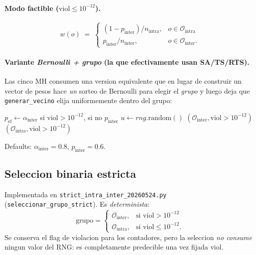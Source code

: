 \documentclass[11pt,a4paper]{article}
\newcommand{\mh}{MH}
\newcommand{\code}[1]{\texttt{#1}}
\begin{document}
\paragraph{Modo factible ($\text{viol}\le 10^{-12}$).}
\begin{equation}
w(o) \;=\;
\begin{cases}
(1-p_{\text{inter}})/n_{\text{intra}}, & o\in\mathcal{O}_{\text{intra}}\\
p_{\text{inter}}/n_{\text{inter}}, & o\in\mathcal{O}_{\text{inter}}.
\end{cases}
\end{equation}

\paragraph{Variante \emph{Bernoulli + grupo} (la que efectivamente usan SA/TS/RTS).}
Las cinco \mh{} consumen una version equivalente que en lugar de
construir un vector de pesos hace \emph{un} sorteo de Bernoulli para
elegir el \emph{grupo} y luego deja que \code{generar\_vecino} elija
uniformemente dentro del grupo:
\begin{algorithm}[H]
\caption{\textsc{SeleccionarGrupo}$(rng,\text{viol},\mathcal{O}_{\text{intra}},
\mathcal{O}_{\text{inter}})$}
\begin{algorithmic}[1]
\State $p_{\text{ef}} \gets \alpha_{\text{inter}}$ si $\text{viol}>10^{-12}$, si no $p_{\text{inter}}$
\State $u \gets rng.\text{random}()$
   \State \Return $(\mathcal{O}_{\text{inter}}, \text{viol}>10^{-12})$
\EndIf
\State \Return $(\mathcal{O}_{\text{intra}}, \text{viol}>10^{-12})$
\end{algorithmic}
\end{algorithm}
Defaults: $\alpha_{\text{inter}}=0.8$, $p_{\text{inter}}=0.6$.

\subsection{Seleccion binaria estricta}

Implementada en \code{strict\_intra\_inter\_20260524.py}
(\code{seleccionar\_grupo\_strict}). Es \emph{determinista}:
\begin{equation}
\text{grupo} =
\begin{cases}
\mathcal{O}_{\text{inter}}, & \text{si }\text{viol}>10^{-12}\\
\mathcal{O}_{\text{intra}}, & \text{si }\text{viol}\le 10^{-12}.
\end{cases}
\end{equation}
Se conserva el flag de violacion para los contadores, pero la
seleccion \emph{no consume} ningun valor del RNG: es completamente
predecible una vez fijada $\text{viol}$.
\end{document}
